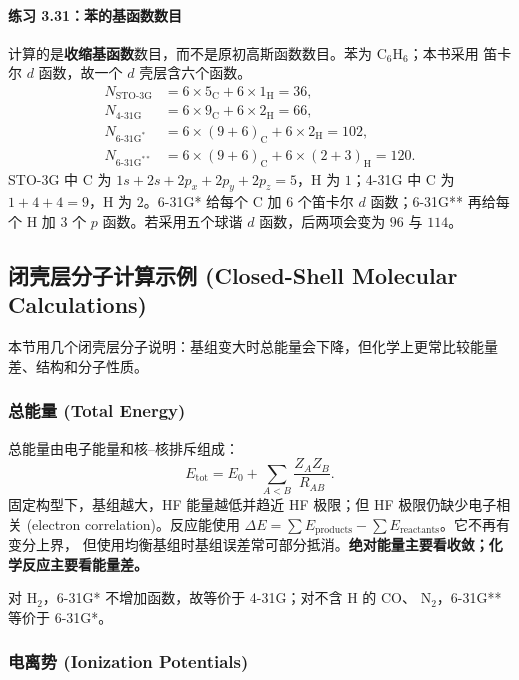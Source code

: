 \documentclass[fontset=none,12pt,a4paper]{ctexart}
\numberwithin{equation}{section}
\begin{document}
\paragraph{练习 3.31：苯的基函数数目}
计算的是\textbf{收缩基函数}数目，而不是原初高斯函数数目。苯为 $\mathrm{C_6H_6}$；本书采用
笛卡尔 $d$ 函数，故一个 $d$ 壳层含六个函数。
\begin{align}
  N_{\mathrm{STO\text{-}3G}}
  &=6\times 5_{\mathrm C}+6\times 1_{\mathrm H}=36,\\
  N_{\mathrm{4\text{-}31G}}
  &=6\times 9_{\mathrm C}+6\times 2_{\mathrm H}=66,\\
  N_{\mathrm{6\text{-}31G^*}}
  &=6\times(9+6)_{\mathrm C}+6\times 2_{\mathrm H}=102,\\
  N_{\mathrm{6\text{-}31G^{**}}}
  &=6\times(9+6)_{\mathrm C}+6\times(2+3)_{\mathrm H}=120.
\end{align}
STO-3G 中 C 为 $1s+2s+2p_x+2p_y+2p_z=5$，H 为 $1$；4-31G 中 C 为
$1+4+4=9$，H 为 $2$。6-31G* 给每个 C 加 $6$ 个笛卡尔 $d$ 函数；6-31G** 再给每个 H
加 $3$ 个 $p$ 函数。若采用五个球谐 $d$ 函数，后两项会变为 $96$ 与 $114$。

\subsection{闭壳层分子计算示例 (Closed-Shell Molecular Calculations)}

本节用几个闭壳层分子说明：基组变大时总能量会下降，但化学上更常比较能量差、结构和分子性质。

\subsubsection{总能量 (Total Energy)}

总能量由电子能量和核--核排斥组成：
\[
  E_{\mathrm{tot}}=E_0+\sum_{A<B}\frac{Z_AZ_B}{R_{AB}}.
\]
固定构型下，基组越大，HF 能量越低并趋近 HF 极限；但 HF 极限仍缺少电子相关
(electron correlation)。反应能使用
\(\Delta E=\sum E_{\mathrm{products}}-\sum E_{\mathrm{reactants}}\)。它不再有变分上界，
但使用均衡基组时基组误差常可部分抵消。\textbf{绝对能量主要看收敛；化学反应主要看能量差。}

对 $\mathrm{H_2}$，6-31G* 不增加函数，故等价于 4-31G；对不含 H 的 $\mathrm{CO}$、
$\mathrm{N_2}$，6-31G** 等价于 6-31G*。

\subsubsection{电离势 (Ionization Potentials)}
\end{document}
